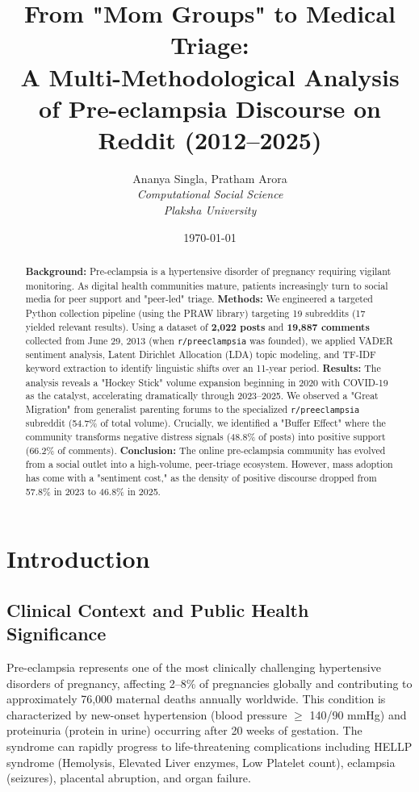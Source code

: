\documentclass[12pt, a4paper]{article}
\title{\textbf{From "Mom Groups" to Medical Triage: \\ A Multi-Methodological Analysis of Pre-eclampsia Discourse on Reddit (2012--2025)}}
\author{Ananya Singla, Pratham Arora \\ \textit{Computational Social Science} \\ \textit{Plaksha University}}
\date{\today}
\begin{document}
\maketitle

\begin{abstract}
\noindent \textbf{Background:} Pre-eclampsia is a hypertensive disorder of pregnancy requiring vigilant monitoring. As digital health communities mature, patients increasingly turn to social media for peer support and "peer-led" triage.
\noindent \textbf{Methods:} We engineered a targeted Python collection pipeline (using the PRAW library) targeting 19 subreddits (17 yielded relevant results). Using a dataset of \textbf{2,022 posts} and \textbf{19,887 comments} collected from June 29, 2013 (when \texttt{r/preeclampsia} was founded), we applied VADER sentiment analysis, Latent Dirichlet Allocation (LDA) topic modeling, and TF-IDF keyword extraction to identify linguistic shifts over an 11-year period.
\noindent \textbf{Results:} The analysis reveals a "Hockey Stick" volume expansion beginning in 2020 with COVID-19 as the catalyst, accelerating dramatically through 2023--2025. We observed a "Great Migration" from generalist parenting forums to the specialized \texttt{r/preeclampsia} subreddit (54.7\% of total volume). Crucially, we identified a "Buffer Effect" where the community transforms negative distress signals (48.8\% of posts) into positive support (66.2\% of comments).
\noindent \textbf{Conclusion:} The online pre-eclampsia community has evolved from a social outlet into a high-volume, peer-triage ecosystem. However, mass adoption has come with a "sentiment cost," as the density of positive discourse dropped from 57.8\% in 2023 to 46.8\% in 2025.
\end{abstract}

\section{Introduction}

\subsection{Clinical Context and Public Health Significance}
Pre-eclampsia represents one of the most clinically challenging hypertensive disorders of pregnancy, affecting 2--8\% of pregnancies globally and contributing to approximately 76,000 maternal deaths annually worldwide. This condition is characterized by new-onset hypertension (blood pressure $\geq$ 140/90 mmHg) and proteinuria (protein in urine) occurring after 20 weeks of gestation. The syndrome can rapidly progress to life-threatening complications including HELLP syndrome (Hemolysis, Elevated Liver enzymes, Low Platelet count), eclampsia (seizures), placental abruption, and organ failure.
\end{document}
